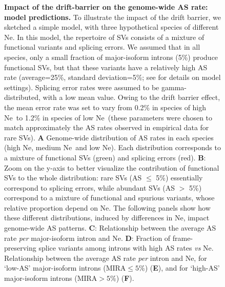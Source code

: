 \begin{figure}[h!]
       \caption[Impact of the drift-barrier on the genome-wide AS rate: model predictions]{\footnotesize{\textbf{Impact of the drift-barrier on the genome-wide AS rate: model predictions.}} \scriptsize{To illustrate the impact of the drift barrier, we sketched a simple model, with three hypothetical species of different \acrshort{Ne}. In this model, the repertoire of \acrshort{SV}s consists of a mixture of functional variants and splicing errors. We assumed that in all species, only a small fraction of major-isoform introns (5\%) produce functional \acrshort{SV}s, but that these variants have a relatively high AS rate (average=25\%, standard deviation=5\%; see  for details on model settings). Splicing error rates were assumed to be gamma-distributed, with a low mean value. Owing to the drift barrier effect, the mean error rate was set to vary from 0.2\% in species of high \acrshort{Ne}~to 1.2\% in species of low \acrshort{Ne}~(these parameters were chosen to match approximately the AS rates observed in empirical data for rare \acrshort{SV}s). \textbf{A} Genome-wide distribution of AS rates in each species (high \acrshort{Ne}, medium \acrshort{Ne}~and low \acrshort{Ne}). Each distribution corresponds to a mixture of functional \acrshort{SV}s (green) and splicing errors (red). \textbf{B}: Zoom on the y-axis to better visualize the contribution of functional \acrshort{SV}s to the whole distribution: rare \acrshort{SV}s (AS $\leq$ 5\%) essentially correspond to splicing errors, while abundant \acrshort{SV}s (AS $>$ 5\%) correspond to a mixture of functional and spurious variants, whose relative proportion depend on \acrshort{Ne}. The following panels show how these different distributions, induced by differences in \acrshort{Ne}, impact genome-wide AS patterns. \textbf{C}: Relationship between the average AS rate \textit{per} major-isoform intron and \acrshort{Ne}. \textbf{D}: Fraction of frame-preserving splice variants among introns with high AS rates \textit{vs} \acrshort{Ne}. Relationship between the average AS rate \textit{per} intron and \acrshort{Ne}, for ‘low-AS’ major-isoform introns ($\mathrm{MIRA\leq5}$\%) (\textbf{E}), and for ‘high-AS’ major-isoform introns ($\mathrm{MIRA>5}$\%) (\textbf{F}).\newline}}
    \label{fig:AS7}
\end{figure}


\newpage

